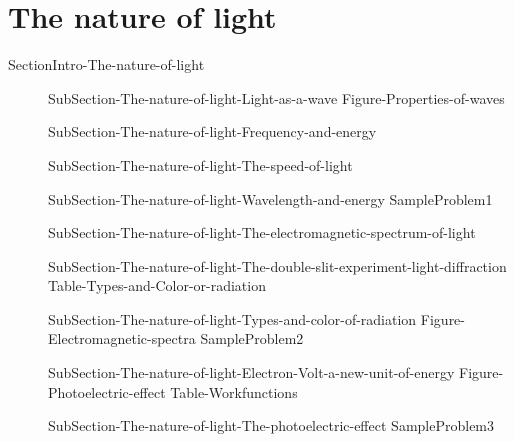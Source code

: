 \documentclass[main.tex]{subfiles}
\newcommand\chapterlabel{Ch-radiation}\setcounter{figurenewcounter}{0}\setcounter{tablenewcounter}{0}\setcounter{formulanewcounter}{0}
\begin{document}
\section{The nature of light}{SectionIntro-The-nature-of-light}
\sloppy
\begin{description}
\item[]{SubSection-The-nature-of-light-Light-as-a-wave}
{Figure-Properties-of-waves}
\item[] {SubSection-The-nature-of-light-Frequency-and-energy}
\item[] {SubSection-The-nature-of-light-The-speed-of-light}
\item[] {SubSection-The-nature-of-light-Wavelength-and-energy}
  {SampleProblem1}
\item[]{SubSection-The-nature-of-light-The-electromagnetic-spectrum-of-light}
  \vspace{-1cm}{Figure-Electromagnetic-field}
\item[] {SubSection-The-nature-of-light-The-double-slit-experiment-light-diffraction}
  \vspace{-1cm}{Figure-Double-slit}
 \vspace{0cm}\hspace{-5cm}{Figure-waves-and-life}
{Table-Types-and-Color-or-radiation}
\item[] {SubSection-The-nature-of-light-Types-and-color-of-radiation}
{Figure-Electromagnetic-spectra}
  {SampleProblem2}
\item[]{SubSection-The-nature-of-light-Electron-Volt-a-new-unit-of-energy}
{Figure-Photoelectric-effect}
{Table-Workfunctions}
\item[]{SubSection-The-nature-of-light-The-photoelectric-effect}
  {SampleProblem3}
\end{description}
\end{document}
